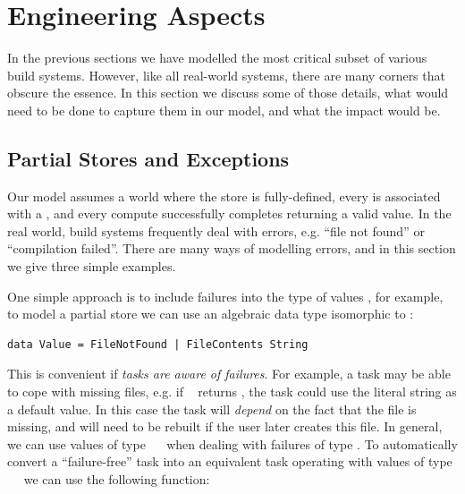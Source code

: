 \section{Engineering Aspects}\label{sec-engineering}

In the previous sections we have modelled the most critical subset of various
build systems. However, like all real-world systems, there are many corners that
obscure the essence. In this section we discuss some of those details, what
would need to be done to capture them in our model, and what the impact would be.

\subsection{Partial Stores and Exceptions}\label{sec-failures}

Our model assumes a world where the store is fully-defined, every  is
associated with a , and every compute successfully completes returning a
valid value. In the real world, build systems frequently deal with errors, e.g.
``file not found'' or ``compilation failed''. There are many ways of modelling
errors, and in this section we give three simple examples.


One simple approach is to include failures into the type of values , for
example, to model a partial store we can use an algebraic data type isomorphic
to :

\vspace{1mm}
\begin{verbatim}
data Value = FileNotFound | FileContents String
\end{verbatim}
\vspace{1mm}

\noindent
This is convenient if \emph{tasks are aware of failures}. For example, a task
may be able to cope with missing files, e.g. if ~
returns , the task could use the literal string  as
a default value. In this case the task will \emph{depend} on the fact that the
file  is missing, and will need to be rebuilt if the user
later creates this file. In general, we can use values of type
~~ when dealing with failures of type . To
automatically convert a ``failure-free'' task into an equivalent task operating
with values of type ~~ we can use the following function:

